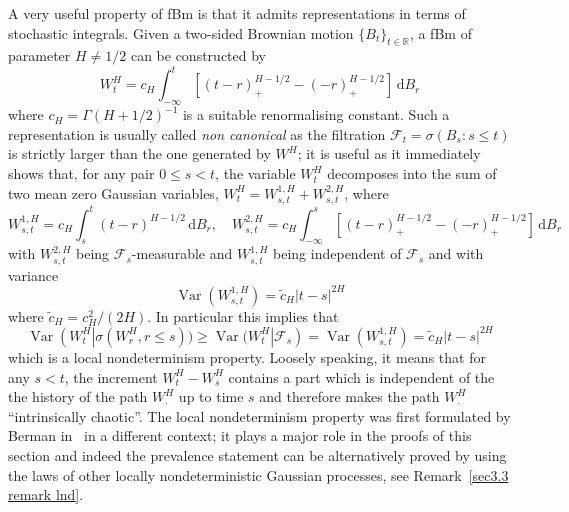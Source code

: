 \documentclass[10pt]{article}
\newcommand{\mathd}{\mathrm{d}}
\newcommand{\nobracket}{}
\newcommand{\tmem}[1]{{\em #1\/}}
\newcommand{\tmop}[1]{\ensuremath{\operatorname{#1}}}
\begin{document}
A very useful property of fBm is that it admits representations in terms of
stochastic integrals. Given a two-sided Brownian motion $\{ B_t \}_{t \in
\mathbb{R}}$, a fBm of parameter $H \neq 1 / 2$ can be constructed by
\begin{equation}
  W^H_t = c_H \int_{- \infty}^t [(t - r)^{H - 1 / 2}_+ - (- r)_+^{H - 1 / 2}]
  \, \mathd B_r \label{sec2.2 non canonical representation}
\end{equation}
where $c_H = \Gamma (H + 1 / 2)^{- 1}$ is a suitable renormalising constant.
Such a representation is usually called {\tmem{non canonical}} as the
filtration $\mathcal{F}_t = \sigma (B_s : s \leqslant t)$ is strictly larger
than the one generated by $W^H$; it is useful as it immediately shows that,
for any pair $0 \leqslant s < t$, the variable $W^H_t$ decomposes into the sum
of two mean zero Gaussian variables, $W^H_t = W^{1, H}_{s, t} + W^{2, H}_{s,
t}$, where
\[ W^{1, H}_{s, t} = c_H \int_s^t (t - r)^{H - 1 / 2} \, \mathd B_r, \quad
   W^{2, H}_{s, t} = c_H \int_{- \infty}^s [(t - r)^{H - 1 / 2}_+ - (- r)_+^{H
   - 1 / 2}] \, \mathd B_r \]
with $W^{2, H}_{s, t}$ being $\mathcal{F}_s$-measurable and $W^{1, H}_{s, t}$
being independent of $\mathcal{F}_s$ and with variance
\[ \tmop{Var} (W^{1, H}_{s, t}) = \tilde{c}_H | t - s |^{2 H} \]
where $\tilde{c}_H = c_H^2 / (2 H)$. In particular this implies that
\begin{equation}
  \tmop{Var} (W^H_t | \sigma (W^H_r, r \leqslant s \nobracket)) \geqslant
  \tmop{Var} (W^H_t | \mathcal{F}_s \nobracket) = \tmop{Var} (W^{1, H}_{s, t})
  = \tilde{c}_H | t - s |^{2 H} \label{sec2.2 lnd}
\end{equation}
which is a local nondeterminism property. Loosely speaking, it means that for
any $s < t$, the increment $W_t^H - W^H_s$ contains a part which is
independent of the the history of the path $W^H_{\cdot}$ up to time $s$ and
therefore makes the path $W^H_{\cdot}$ ``intrinsically chaotic''. The local
nondeterminism property was first formulated by Berman in~{\cite{berman73}} in
a different context; it plays a major role in the proofs of this section and
indeed the prevalence statement can be alternatively proved by using the laws
of other locally nondeterministic Gaussian processes, see Remark~\ref{sec3.3
remark lnd}.

\
\end{document}
